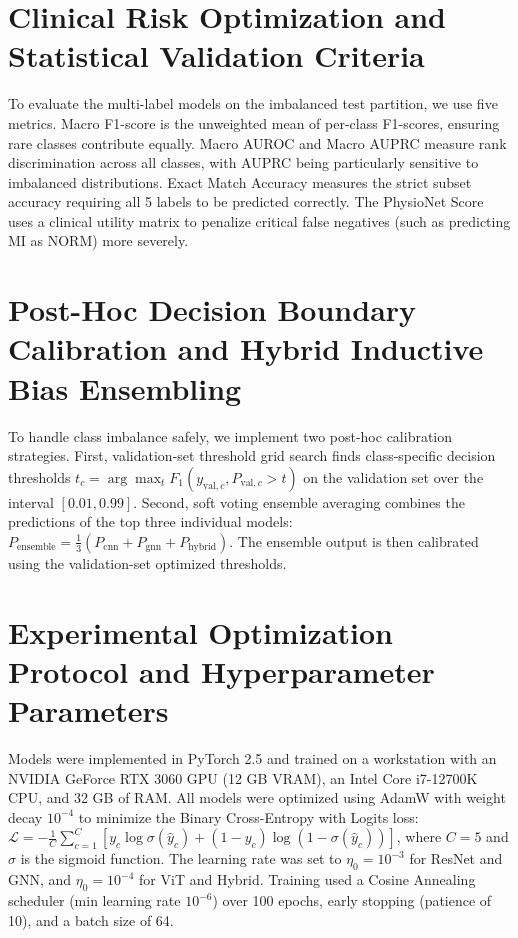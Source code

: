 \documentclass[14pt]{extarticle}
\begin{document}
\section{Clinical Risk Optimization and Statistical Validation Criteria}
\label{sec:metrics}
To evaluate the multi-label models on the imbalanced test partition, we use five metrics. Macro F1-score is the unweighted mean of per-class F1-scores, ensuring rare classes contribute equally. Macro AUROC and Macro AUPRC measure rank discrimination across all classes, with AUPRC being particularly sensitive to imbalanced distributions. Exact Match Accuracy measures the strict subset accuracy requiring all 5 labels to be predicted correctly. The PhysioNet Score uses a clinical utility matrix to penalize critical false negatives (such as predicting MI as NORM) more severely.

\section{Post-Hoc Decision Boundary Calibration and Hybrid Inductive Bias Ensembling}
\label{sec:posthoc}
To handle class imbalance safely, we implement two post-hoc calibration strategies.
First, validation-set threshold grid search finds class-specific decision thresholds $t_c = \arg\max_{t} F_1(y_{\text{val},c}, P_{\text{val},c} > t)$ on the validation set over the interval $[0.01, 0.99]$.
Second, soft voting ensemble averaging combines the predictions of the top three individual models: $P_{\text{ensemble}} = \frac{1}{3}(P_{\text{cnn}} + P_{\text{gnn}} + P_{\text{hybrid}})$. The ensemble output is then calibrated using the validation-set optimized thresholds.

\section{Experimental Optimization Protocol and Hyperparameter Parameters}
Models were implemented in PyTorch 2.5 and trained on a workstation with an NVIDIA GeForce RTX 3060 GPU (12 GB VRAM), an Intel Core i7-12700K CPU, and 32 GB of RAM. All models were optimized using AdamW with weight decay $10^{-4}$ to minimize the Binary Cross-Entropy with Logits loss: $\mathcal{L} = -\frac{1}{C}\sum_{c=1}^{C} [y_c\log\sigma(\hat{y}_c) + (1-y_c)\log(1-\sigma(\hat{y}_c))]$, where $C=5$ and $\sigma$ is the sigmoid function. The learning rate was set to $\eta_0 = 10^{-3}$ for ResNet and GNN, and $\eta_0 = 10^{-4}$ for ViT and Hybrid. Training used a Cosine Annealing scheduler (min learning rate $10^{-6}$) over 100 epochs, early stopping (patience of 10), and a batch size of 64.
\end{document}
